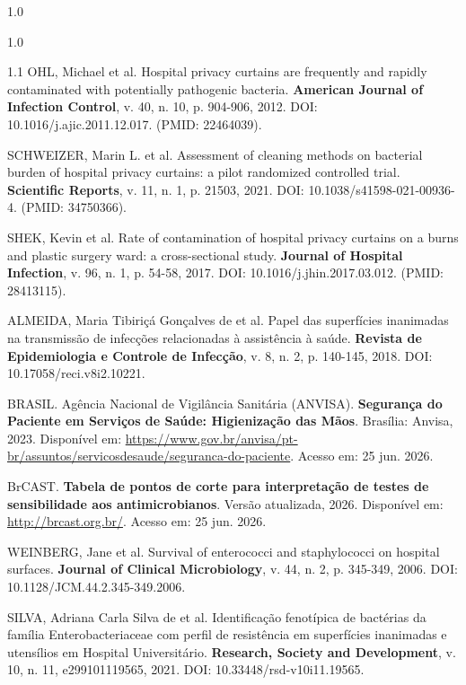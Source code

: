 \documentclass[12pt,a4paper]{article}
\begin{document}
\begin{spacing}{1.0}
\begin{spacing}{1.0}
\begin{spacing}{1.1}
\vspace{12pt}
\noindent OHL, Michael et al. Hospital privacy curtains are frequently and rapidly contaminated with potentially pathogenic bacteria. \textbf{American Journal of Infection Control}, v. 40, n. 10, p. 904-906, 2012. DOI: 10.1016/j.ajic.2011.12.017. (PMID: 22464039).

\vspace{12pt}
\noindent SCHWEIZER, Marin L. et al. Assessment of cleaning methods on bacterial burden of hospital privacy curtains: a pilot randomized controlled trial. \textbf{Scientific Reports}, v. 11, n. 1, p. 21503, 2021. DOI: 10.1038/s41598-021-00936-4. (PMID: 34750366).

\vspace{12pt}
\noindent SHEK, Kevin et al. Rate of contamination of hospital privacy curtains on a burns and plastic surgery ward: a cross-sectional study. \textbf{Journal of Hospital Infection}, v. 96, n. 1, p. 54-58, 2017. DOI: 10.1016/j.jhin.2017.03.012. (PMID: 28413115).

\vspace{12pt}
\noindent ALMEIDA, Maria Tibiriçá Gonçalves de et al. Papel das superfícies inanimadas na transmissão de infecções relacionadas à assistência à saúde. \textbf{Revista de Epidemiologia e Controle de Infecção}, v. 8, n. 2, p. 140-145, 2018. DOI: 10.17058/reci.v8i2.10221.

\vspace{12pt}
\noindent BRASIL. Agência Nacional de Vigilância Sanitária (ANVISA). \textbf{Segurança do Paciente em Serviços de Saúde: Higienização das Mãos}. Brasília: Anvisa, 2023. Disponível em: \url{https://www.gov.br/anvisa/pt-br/assuntos/servicosdesaude/seguranca-do-paciente}. Acesso em: 25 jun. 2026.

\vspace{12pt}
\noindent BrCAST. \textbf{Tabela de pontos de corte para interpretação de testes de sensibilidade aos antimicrobianos}. Versão atualizada, 2026. Disponível em: \url{http://brcast.org.br/}. Acesso em: 25 jun. 2026.

\vspace{12pt}
\noindent WEINBERG, Jane et al. Survival of enterococci and staphylococci on hospital surfaces. \textbf{Journal of Clinical Microbiology}, v. 44, n. 2, p. 345-349, 2006. DOI: 10.1128/JCM.44.2.345-349.2006.

\vspace{12pt}
\noindent SILVA, Adriana Carla Silva de et al. Identificação fenotípica de bactérias da família Enterobacteriaceae com perfil de resistência em superfícies inanimadas e utensílios em Hospital Universitário. \textbf{Research, Society and Development}, v. 10, n. 11, e299101119565, 2021. DOI: 10.33448/rsd-v10i11.19565.


\end{spacing}
\end{spacing}
\end{spacing}
\end{document}
